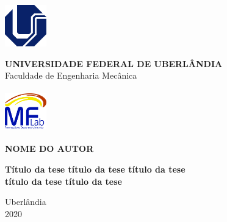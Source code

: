 \begin{titlepage}
	\begin{center}
		\begin{minipage}{2.0cm}
			\begin{center}
				\includegraphics[width=1.8cm,height=1.8cm]{prefiles/ufu.pdf}	
			\end{center}
		\end{minipage}\hfill
		\begin{minipage}{11.0cm}
			\begin{center}
				\large{\textbf{ UNIVERSIDADE FEDERAL DE UBERLÂNDIA}}\\[0.1cm]
				\large{Faculdade de Engenharia Mecânica}\\[0.1cm]
			\end{center}
		\end{minipage}\hfill
		\begin{minipage}{2.0cm}
			\begin{center}
				\includegraphics[width=1.8cm,height=1.8cm]{prefiles/mflab.pdf}
			\end{center}
		\end{minipage}
		
		\vspace*{4cm}
		
		\textbf{NOME DO AUTOR}
		
		\vspace{4.5cm}
		{\fontsize{23}{23} \textbf{Título da tese título da tese título da tese}}	\\ \vspace{1.2ex}
		{\fontsize{23}{23} \textbf{título da tese título da tese}}\\ \vspace{1.2ex}
		
		\vspace*{11.2cm}
		Uberlândia\\2020
		
	\end{center}
\end{titlepage}

